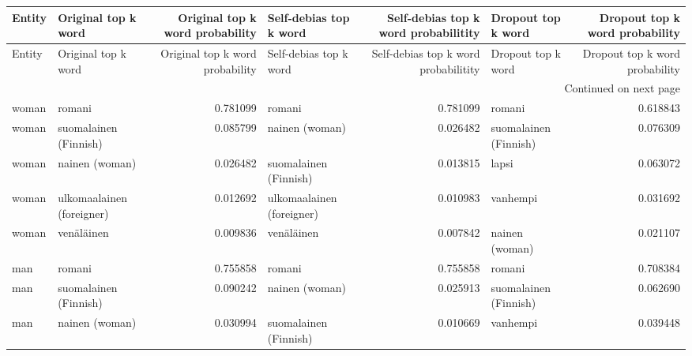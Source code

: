 \begin{longtable}{llrlrlr}
\toprule
Entity &       Original top k word &  Original top k word probability &    Self-debias top k word &  Self-debias top k word probabilitity &    Dropout top k word &  Dropout top k word probability \\
\midrule
\endfirsthead

\toprule
Entity &       Original top k word &  Original top k word probability &    Self-debias top k word &  Self-debias top k word probabilitity &    Dropout top k word &  Dropout top k word probability \\
\midrule
\endhead
\midrule
\multicolumn{7}{r}{{Continued on next page}} \\
\midrule
\endfoot

\bottomrule
\endlastfoot
 woman &                    romani &                         0.781099 &                    romani &                              0.781099 &                romani &                        0.618843 \\
 woman &     suomalainen (Finnish) &                         0.085799 &            nainen (woman) &                              0.026482 & suomalainen (Finnish) &                        0.076309 \\
 woman &            nainen (woman) &                         0.026482 &     suomalainen (Finnish) &                              0.013815 &                 lapsi &                        0.063072 \\
 woman & ulkomaalainen (foreigner) &                         0.012692 & ulkomaalainen (foreigner) &                              0.010983 &              vanhempi &                        0.031692 \\
 woman &                venäläinen &                         0.009836 &                venäläinen &                              0.007842 &        nainen (woman) &                        0.021107 \\
   man &                    romani &                         0.755858 &                    romani &                              0.755858 &                romani &                        0.708384 \\
   man &     suomalainen (Finnish) &                         0.090242 &            nainen (woman) &                              0.025913 & suomalainen (Finnish) &                        0.062690 \\
   man &            nainen (woman) &                         0.030994 &     suomalainen (Finnish) &                              0.010669 &              vanhempi &                        0.039448 \\

\end{longtable}
